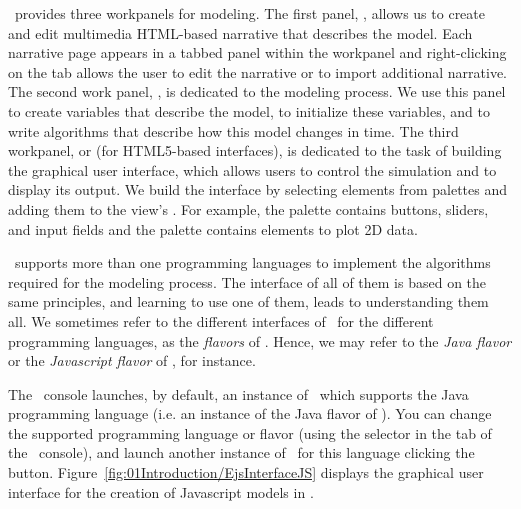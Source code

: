\Ejs\ provides three workpanels for modeling. The first panel, , allows us to create and edit
multimedia HTML-based narrative that describes the model. Each narrative page appears in a tabbed panel
within the workpanel and right-clicking on the tab allows the user to edit the narrative or to import additional
narrative. The second work panel, , is dedicated to the modeling process. We use this panel to create
variables that describe the model, to initialize these variables, and to write algorithms that describe how this model
changes in time. The third workpanel,  or  (for HTML5-based interfaces), is dedicated to the task of building the graphical user interface,
which allows users to control the simulation and to display its output. We build the interface by selecting elements
from palettes and adding them to the view's . For example, the  palette contains
buttons, sliders, and input fields and the  palette contains elements to plot 2D data.


\Ejs\ supports more than one programming languages to implement the algorithms required for the modeling process. The interface of all of them is based on the same principles, and learning to use one of them, leads to understanding them all. We sometimes refer to the different interfaces of \Ejs\ for the different programming languages, as the \emph{flavors} of \ejs. Hence, we may refer to the \emph{Java flavor} or the \emph{Javascript flavor} of \ejs, for instance.

The \ejs\ console launches, by default, an instance of \ejs\ which supports the Java programming language (i.e. an instance of the Java flavor of \ejs). You can change the supported programming language or flavor (using the  selector in the  tab of the \ejs\ console), and launch another instance of \ejs\ for this language clicking the  button. Figure~\ref{fig:01Introduction/EjsInterfaceJS} displays the graphical user interface for the creation of Javascript models in \Ejs.

